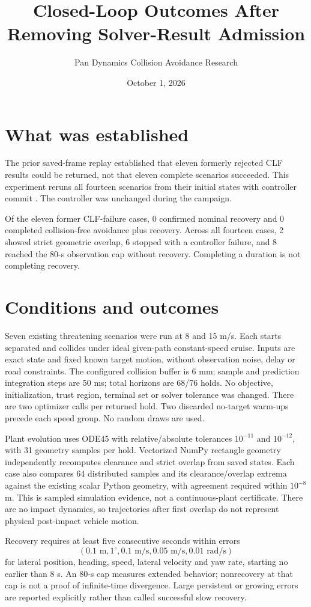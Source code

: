 \documentclass[11pt]{article}
\title{Closed-Loop Outcomes After Removing Solver-Result Admission}
\author{Pan Dynamics Collision Avoidance Research}
\date{October 1, 2026}
\begin{document}
\maketitle
\section{What was established}
The prior saved-frame replay established that eleven formerly rejected CLF
results could be returned, not that eleven complete scenarios succeeded.
This experiment reruns all fourteen scenarios from their initial states with
controller commit .
The controller was unchanged during the campaign.

Of the eleven former CLF-failure cases, 0 confirmed nominal recovery and 0 completed collision-free avoidance plus recovery. Across all fourteen cases, 2 showed strict geometric overlap, 6 stopped with a controller failure, and 8 reached the 80-s observation cap without recovery. Completing a duration is not completing recovery.


\section{Conditions and outcomes}
Seven existing threatening scenarios were run at 8 and 15 m/s. Each starts
separated and collides under ideal given-path constant-speed cruise. Inputs
are exact state and fixed known target motion, without observation noise,
delay or road constraints. The configured collision buffer is 6 mm; sample
and prediction integration steps are 50 ms; total horizons are 68/76 holds.
No objective, initialization, trust region, terminal set or solver tolerance
was changed. There are two optimizer calls per returned hold. Two discarded
no-target warm-ups precede each speed group. No random draws are used.

Plant evolution uses ODE45 with relative/absolute tolerances $10^{-11}$ and
$10^{-12}$, with 31 geometry samples per hold. Vectorized NumPy rectangle geometry independently recomputes clearance and
strict overlap from saved states. Each case also compares 64 distributed
samples and its clearance/overlap extrema against the existing scalar Python
geometry, with agreement required within $10^{-8}$ m.
This is sampled simulation evidence, not a continuous-plant certificate.
There are no impact dynamics, so trajectories after first overlap do not
represent physical post-impact vehicle motion.

Recovery requires at least five consecutive seconds within errors
\[(0.1\text{ m},1^\circ,0.1\text{ m/s},0.05\text{ m/s},0.01\text{ rad/s})\]
for lateral position, heading, speed, lateral velocity and yaw rate, starting
no earlier than 8 s. An 80-s cap measures extended behavior; nonrecovery at
that cap is not a proof of infinite-time divergence. Large persistent or
growing errors are reported explicitly rather than called successful slow
recovery.
\end{document}
